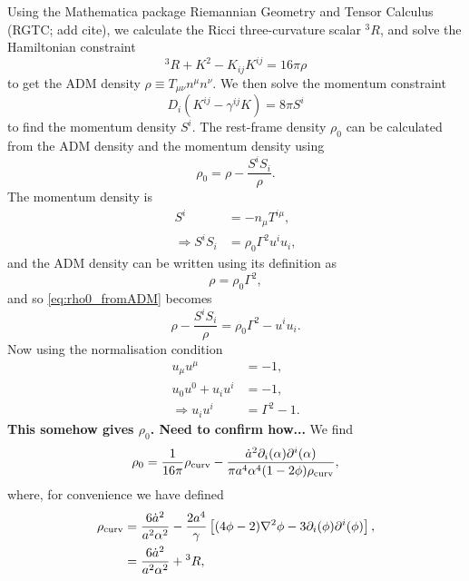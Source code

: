 Using the Mathematica package Riemannian Geometry and Tensor Calculus (RGTC; add cite), we calculate the Ricci three-curvature scalar ${}^3 R$, and solve the Hamiltonian constraint
\begin{equation}
	{}^3 R + K^2 - K_{ij}K^{ij} = 16\pi\rho
\end{equation}
to get the ADM density $\rho \equiv T_{\mu\nu} n^\mu n^\nu$. We then solve the momentum constraint
\begin{equation}
	D_i \left( K^{ij} - \gamma^{ij} K \right) = 8\pi S^i
\end{equation}
to find the momentum density $S^i$. The rest-frame density $\rho_0$ can be calculated from the ADM density and the momentum density using
\begin{equation} \label{eq:rho0_fromADM}
	\rho_0 = \rho - \frac{S^i S_i}{\rho}.
\end{equation}
The momentum density is
\begin{align}
	S^i &= - n_\mu T^{i\mu}, \label{eq:Si}\\
	\Rightarrow S^i S_i &= \rho_0 \Gamma^2 u^i u_i,
\end{align}
and the ADM density can be written using its definition as
\begin{equation}
	\rho = \rho_0 \Gamma^2,
\end{equation}
and so \eqref{eq:rho0_fromADM} becomes
\begin{equation}
	\rho - \frac{S^i S_i}{\rho} = \rho_0 \Gamma^2 - u^i u_i.
\end{equation}
Now using the normalisation condition 
\begin{align}
	u_\mu u^\mu &= -1, \\
	u_0 u^0 + u_i u^i &= -1, \\
	\Rightarrow u_i u^i &= \Gamma^2 - 1.
\end{align}
\textbf{This somehow gives $\rho_0$. Need to confirm how...} We find
\begin{equation}
	\rho_0 = \frac{1}{16\pi} \rho_{\rm curv} - \frac{\dot{a}^2 \partial_i (\alpha) \partial^i (\alpha)}{\pi a^4 \alpha^4 (1-2\phi) \rho_{\rm curv}}, 
\end{equation}
where, for convenience we have defined
\begin{align}
	\rho_{\rm curv} &= \frac{6\dot{a}^2}{a^2 \alpha^2} - \frac{2a^4}{\gamma} \left[ (4\phi - 2) \nabla^2 \phi - 3\partial_i (\phi) \partial^i (\phi) \right], \\
	&= \frac{6\dot{a}^2}{a^2 \alpha^2} + {}^3 R,
\end{align}
